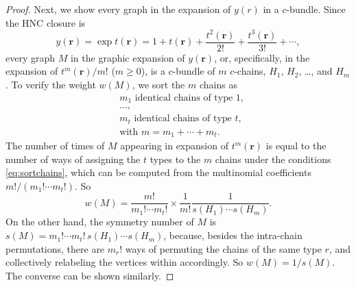 \documentclass[preprint]{revtex4-1}
\newcommand{\vct}[1]{\mathbf{#1}}
\providecommand{\vr}{} %
\renewcommand{\vr}{\vct{r}}
\begin{document}
\begin{proof}
Next, we show every graph in the expansion of $y(r)$
  in a $c$-bundle.
%
Since the HNC closure is
\[
  y(\vr)
= \exp t(\vr)
=
1 + t(\vr)
+ \frac{ t^2(\vr) }{ 2! }
+ \frac{ t^3(\vr) }{ 3! }+ \cdots,
\]
every graph $M$ in the graphic expansion of $y(\vr)$,
  or, specifically, in the expansion of $t^m(\vr)/m!$ ($m \ge 0$),
  is a $c$-bundle of $m$ $c$-chains,
  $H_1$, $H_2$, \dots, and $H_m$.
%
%
To verify the weight $w(M)$,
  we sort the $m$ chains as
\begin{equation}
\begin{split}
& \text{$m_1$ identical chains of type $1$}, \\
& \dots, \\
& \text{$m_t$ identical chains of type $t$}, \\
& \text{with $m = m_1 + \cdots + m_t$}.
\end{split}\label{eq:sortchains}
\end{equation}
%
The number of times of $M$
  appearing in expansion of $t^m(\vr)$
  is equal to the number of ways
  of assigning the $t$ types to the $m$ chains
  under the conditions \eqref{eq:sortchains},
  which can be computed from the multinomial coefficients
  $m!/(m_1! \cdots m_t!)$.
%
So
%
\[
  w(M)
=
  \frac{ m! } { m_1! \cdots m_t! }
  \times
  \frac{ 1 } { m! }
  \frac{ 1 } { s(H_1) \cdots s(H_m) }.
\]
%
On the other hand,
  the symmetry number of $M$ is
  $s(M) = m_1! \cdots m_t! \, s(H_1) \cdots s(H_m)$,
  because, besides the intra-chain permutations,
  there are $m_r!$ ways of permuting the chains of the same type $r$,
  and collectively relabeling the vertices within accordingly.
So $w(M) = 1/s(M)$.
%
The converse can be shown similarly.


\end{proof}
\end{document}
